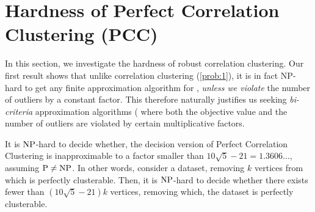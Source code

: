 \section{Hardness of Perfect Correlation Clustering (PCC)}
In this section, we investigate the hardness of robust correlation clustering. Our first result shows that unlike correlation clustering (\ref{prob:1}), it is in fact NP-hard to get any finite approximation algorithm for \robcc, \emph{unless we violate} the number of outliers by a constant factor. This therefore naturally justifies us seeking \emph{bi-criteria} approximation algorithms ( where both the objective value and the number of outliers are violated by certain multiplicative factors. 

\begin{theorem}
It is $\mathrm{NP}$-hard to decide whether, the decision version of Perfect Correlation Clustering is inapproximable to a factor smaller than $10 \sqrt{5} - 21 = 1.3606\dots$, assuming $\mathrm{P} \ne \mathrm{NP}$. In other words, consider a dataset, removing $k$ vertices from which is perfectly clusterable. Then, it is $\mathrm{NP}$-hard to decide whether there exists fewer than $(10 \sqrt{5} - 21)k$ vertices, removing which, the dataset is perfectly clusterable.
\end{theorem}
